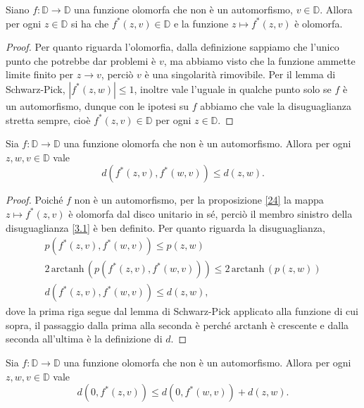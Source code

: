 \begin{prop} \label{24}
  Siano $f:\mathbb{D} \longrightarrow \mathbb{D}$ una funzione olomorfa che non è un automorfismo, $v \in \mathbb{D}$. Allora per ogni $z \in \mathbb{D}$ si ha che $f^*(z,v) \in \mathbb{D}$ e la funzione $z \longmapsto f^*(z,v)$ è olomorfa.
\end{prop}

\begin{proof}
  Per quanto riguarda l'olomorfia, dalla definizione sappiamo che l'unico punto che potrebbe dar problemi è $v$, ma abbiamo visto che la funzione ammette limite finito per $z \longrightarrow v$, perciò $v$ è una singolarità rimovibile. Per il lemma di Schwarz-Pick, $|f^*(z,w)| \le 1$, inoltre vale l'uguale in qualche punto solo se $f$ è un automorfismo, dunque con le ipotesi su $f$ abbiamo che vale la disuguaglianza stretta sempre, cioè $f^*(z,v) \in \mathbb{D}$ per ogni $z \in \mathbb{D}$.
\end{proof}

\begin{thm} \label{31}
  Sia $f:\mathbb{D} \longrightarrow \mathbb{D}$ una funzione olomorfa che non è un automorfismo. Allora per ogni $z, w, v \in \mathbb{D}$ vale
  \begin{equation} \label{3.1}
    d(f^*(z,v),f^*(w,v)) \le d(z,w).
  \end{equation}
\end{thm}

\begin{proof}
  Poiché $f$ non è un automorfismo, per la proposizione \ref{24} la mappa $z \longmapsto f^*(z,v)$ è olomorfa dal disco unitario in sé, perciò il membro sinistro della disuguaglianza \eqref{3.1} è ben definito. Per quanto riguarda la disuguaglianza,
  \begin{align*}
    p(f^*(z,v), f^*(w,v)) \le p(z,w) \\
    2\,\text{arctanh}\,(p(f^*(z,v), f^*(w,v))) \le 2\,\text{arctanh}\,(p(z,w)) \\
    d(f^*(z,v), f^*(w,v)) \le d(z,w),
  \end{align*}
  dove la prima riga segue dal lemma di Schwarz-Pick applicato alla funzione di cui sopra, il passaggio dalla prima alla seconda è perché $\text{arctanh}$ è crescente e dalla seconda all'ultima è la definizione di $d$.
\end{proof}

\begin{cor} \label{32}
  Sia $f:\mathbb{D} \longrightarrow \mathbb{D}$ una funzione olomorfa che non è un automorfismo. Allora per ogni $z, w, v \in \mathbb{D}$ vale
  \begin{equation}
    d(0, f^*(z,v)) \le d(0,f^*(w,v))+d(z,w).
  \end{equation}
\end{cor}

